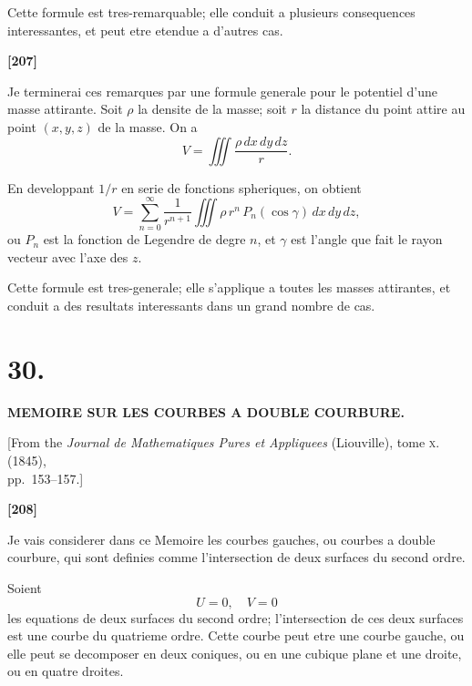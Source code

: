 \documentclass[11pt,a4paper]{book}
\begin{document}
Cette formule est tres-remarquable; elle conduit a plusieurs consequences interessantes,
et peut etre etendue a d'autres cas.

\textbf{[207]}

Je terminerai ces remarques par une formule generale pour le potentiel d'une masse
attirante. Soit $\rho$ la densite de la masse; soit $r$ la distance du point attire au point
$(x, y, z)$ de la masse. On a
\[V = \iiint \frac{\rho\, dx\, dy\, dz}{r}.\]

En developpant $1/r$ en serie de fonctions spheriques, on obtient
\[V = \sum_{n=0}^{\infty} \frac{1}{r^{n+1}} \iiint \rho\, r^n\, P_n(\cos\gamma)\, dx\, dy\, dz,\]
ou $P_n$ est la fonction de Legendre de degre $n$, et $\gamma$ est l'angle que fait le rayon vecteur
avec l'axe des $z$.

Cette formule est tres-generale; elle s'applique a toutes les masses attirantes, et
conduit a des resultats interessants dans un grand nombre de cas.


\newpage
\section*{30.}

\begin{center}
\textbf{MEMOIRE SUR LES COURBES A DOUBLE COURBURE.}
\end{center}

\begin{center}
[From the \textit{Journal de Mathematiques Pures et Appliquees} (Liouville), tome \textsc{x}. (1845),\\
pp.~153--157.]
\end{center}


\textbf{[208]}

Je vais considerer dans ce Memoire les courbes gauches, ou courbes a double
courbure, qui sont definies comme l'intersection de deux surfaces du second ordre.

Soient
\[U = 0,\quad V = 0\]
les equations de deux surfaces du second ordre; l'intersection de ces deux surfaces
est une courbe du quatrieme ordre. Cette courbe peut etre une courbe gauche, ou
elle peut se decomposer en deux coniques, ou en une cubique plane et une droite,
ou en quatre droites.
\end{document}
